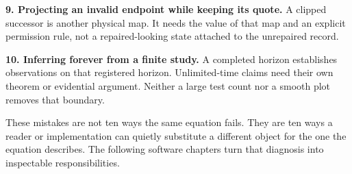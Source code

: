 \textbf{9. Projecting an invalid endpoint while keeping its quote.}
A clipped successor is another physical map. It needs the value of
that map and an explicit permission rule, not a repaired-looking state
attached to the unrepaired record.

\textbf{10. Inferring forever from a finite study.}
A completed horizon establishes observations on that registered horizon.
Unlimited-time claims need their own theorem or evidential argument.
Neither a large test count nor a smooth plot removes that boundary.

These mistakes are not ten ways the same equation fails. They are
ten ways a reader or implementation can quietly substitute a different
object for the one the equation describes. The following software
chapters turn that diagnosis into inspectable responsibilities.
